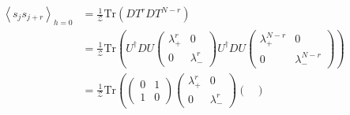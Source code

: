 \[
    \begin{aligned}
        \left\langle s_j s_{j+r} \right\rangle_{h=0} & = \frac{1}{\mathcal{Z}} \text{Tr}(D T^{r} D T^{N-r})                                                                   \\
                                                     & = \frac{1}{\mathcal{Z}} \text{Tr}\left(U^{\dagger} D U \begin{pmatrix}
                                                                                                                  \lambda_+^r & 0           \\
                                                                                                                  0           & \lambda_-^r
                                                                                                              \end{pmatrix} U^{\dagger} D U \begin{pmatrix}
                                                                                                                                                \lambda_+^{N-r} & 0               \\
                                                                                                                                                0               & \lambda_-^{N-r}
                                                                                                                                            \end{pmatrix}\right) \\
                                                     & = \frac{1}{\mathcal{Z}} \text{Tr}\left(\begin{pmatrix}
                                                                                                      0 & 1 \\
                                                                                                      1 & 0
                                                                                                  \end{pmatrix} \begin{pmatrix}
                                                                                                                    \lambda_+^r & 0           \\
                                                                                                                    0           & \lambda_-^r
                                                                                                                \end{pmatrix} \begin{pmatrix}

\end{pmatrix}
\end{aligned}\]
